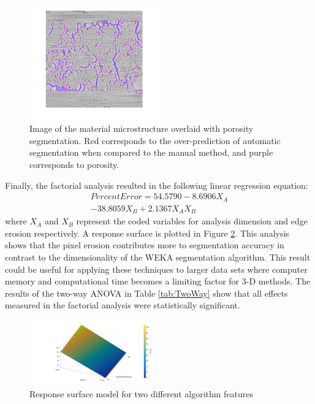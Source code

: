 \documentclass[11pt, twocolumn]{IEEEtran}
\begin{document}
\begin{figure}[h!]
	\centering
	\includegraphics[width=0.5\textwidth]{overlay.png}
	\caption{Image of the material microstructure overlaid with porosity segmentation. Red corresponds to the over-prediction of automatic segmentation when compared to the manual method, and purple corresponds to porosity.}
	\label{fig:overlay}
\end{figure}

Finally, the factorial analysis resulted in the following linear regression equation:
\begin{multline}
Percent Error= 54.5790 - 8.6906 X_A \\
- 38.8059 X_B + 2.1367 X_A X_B
\end{multline}
where $X_A$ and $X_B$ represent the coded variables for analysis dimension and edge erosion respectively. A response surface is plotted in Figure \ref{fig:Surf}. This analysis shows that the pixel erosion contributes more to segmentation accuracy in contrast to the dimensionality of the WEKA segmentation algorithm. This result could be useful for applying these techniques to larger data sets where computer memory and computational time becomes a limiting factor for 3-D methods. The results of the two-way ANOVA in Table \ref{tab:TwoWay} show that all effects measured in the factorial analysis were statistically significant. 

\begin{figure}[h!]
	\centering
	\includegraphics[width=0.5\textwidth]{ResponseSurface.png}
	\caption{Response surface model for two different algorithm features}
	\label{fig:Surf}
\end{figure}
\end{document}
